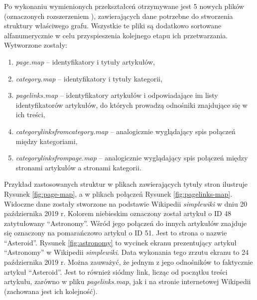 Po wykonaniu wymienionych przekształceń otrzymywane jest 5 nowych plików (oznaczonych rozszerzeniem ), zawierających dane potrzebne do stworzenia struktury właściwego grafu. Wszystkie te pliki są dodatkowo sortowane alfanumerycznie w celu przyspieszenia kolejnego etapu ich przetwarzania. Wytworzone zostały:

\begin{enumerate}[label=\textbullet]
    \setlength\itemsep{1.1em}
    \item \textit{page.map} – identyfikatory i tytuły artykułów,
    \item \textit{category.map} – identyfikatory i tytuły kategorii,
    \item \textit{pagelinks.map} – identyfikatory artykułów i odpowiadające im listy identyfikatorów artykułów, do których prowadzą odnośniki znajdujące się w ich treści,
    \item \textit{categorylinksfromcategory.map} – analogicznie wyglądający spis połączeń między kategoriami,
    \item \textit{categorylinksfrompage.map} – analogicznie wyglądający spis połączeń między stronami artykułów a stronami kategorii.
\end{enumerate}

Przykład zastosowanych struktur w plikach zawierających tytuły stron ilustruje Rysunek \ref{fig:page-map}, a w plikach połączeń Rysunek \ref{fig:pagelinks-map}. Widoczne dane zostały stworzone na podstawie Wikipedii \textit{simplewiki} w dniu 20 października 2019 r. Kolorem niebieskim oznaczony został artykuł o ID 48 zatytułowany ``Astronomy''. Wśród jego połączeń do innych artykułów znajduje się oznaczony na pomarańczowo artykuł o ID 51. Jest to strona o nazwie ``Asteroid''. Rysunek \ref{fig:astronomy} to wycinek ekranu prezentujący artykuł ``Astronomy'' w Wikipedii \textit{simplewiki}. Data wykonania tego zrzutu ekranu to 24 października 2019 r. Można zauważyć, że jednym z jego odnośników to faktycznie artykuł ``Asteroid''. Jest to również siódmy link, licząc od początku treści artykułu, zarówno w pliku \textit{pagelinks.map}, jak i na stronie internetowej Wikipedii (zachowana jest ich kolejność).



